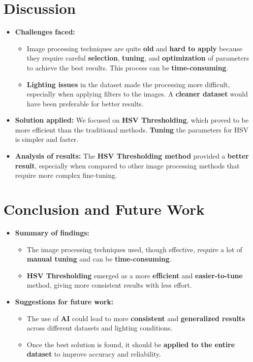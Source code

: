 \documentclass[12pt,a4paper]{article}
\begin{document}
\section{Discussion}

\begin{itemize}
    \item \textbf{Challenges faced:} 
    \begin{itemize}
        \item Image processing techniques are quite \textbf{old} and \textbf{hard to apply} because they require careful \textbf{selection}, \textbf{tuning}, and \textbf{optimization} of parameters to achieve the best results. This process can be \textbf{time-consuming}.
        \item \textbf{Lighting issues} in the dataset made the processing more difficult, especially when applying filters to the images. A \textbf{cleaner dataset} would have been preferable for better results.
    \end{itemize}
    \item \textbf{Solution applied:} We focused on \textbf{HSV Thresholding}, which proved to be more efficient than the traditional methods. \textbf{Tuning} the parameters for HSV is simpler and faster.
    \item \textbf{Analysis of results:} The \textbf{HSV Thresholding method} provided a \textbf{better result}, especially when compared to other image processing methods that require more complex fine-tuning.
\end{itemize}

\section{Conclusion and Future Work}

\begin{itemize}
    \item \textbf{Summary of findings:} 
    \begin{itemize}
        \item The image processing techniques used, though effective, require a lot of \textbf{manual tuning} and can be \textbf{time-consuming}.
        \item \textbf{HSV Thresholding} emerged as a more \textbf{efficient} and \textbf{easier-to-tune} method, giving more consistent results with less effort.
    \end{itemize}
    \item \textbf{Suggestions for future work:}
    \begin{itemize}
        \item The use of \textbf{AI} could lead to more \textbf{consistent} and \textbf{generalized results} across different datasets and lighting conditions.
        \item Once the best solution is found, it should be \textbf{applied to the entire dataset} to improve accuracy and reliability.
    \end{itemize}
\end{itemize}
\end{document}
